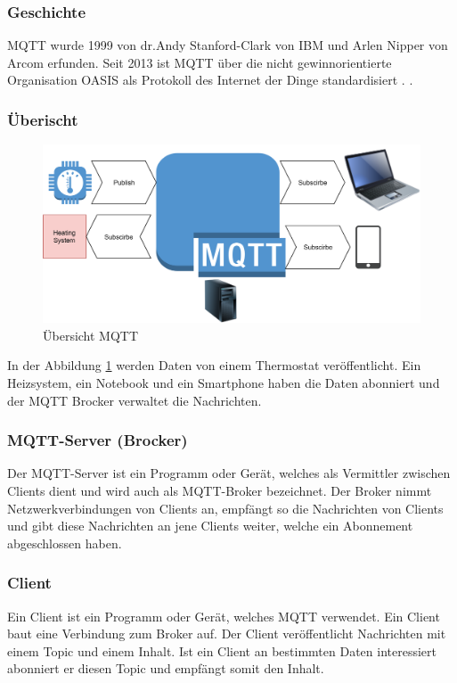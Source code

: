 \subsubsection{Geschichte}
MQTT wurde 1999 von dr.Andy Stanford-Clark von IBM und Arlen Nipper von Arcom erfunden. Seit 2013 ist MQTT über die nicht gewinnorientierte Organisation OASIS als Protokoll des Internet der Dinge standardisiert \cite{noauthor_mqtt-v5.0.pdf_nodate}. .
\subsubsection{Überischt}
 \begin{figure}[H]
 	\centering
 	\includegraphics[width=\textwidth]{graphics/OverviewMQTT.PNG}
 	\caption{Übersicht MQTT} 	
 	\label{pic: OverMQTT}
 \end{figure} 
In der Abbildung \ref{pic: OverMQTT} werden Daten von einem Thermostat veröffentlicht. Ein Heizsystem, ein Notebook und ein Smartphone haben die Daten abonniert und der MQTT Brocker verwaltet die Nachrichten. 

\subsubsection{MQTT-Server (Brocker)}
Der MQTT-Server ist ein Programm oder Gerät, welches als Vermittler zwischen Clients dient und wird auch als MQTT-Broker bezeichnet. Der Broker nimmt Netzwerkverbindungen von Clients an, empfängt so die Nachrichten von Clients und gibt diese Nachrichten an jene Clients weiter, welche ein Abonnement abgeschlossen haben.

\subsubsection{Client}
Ein Client ist ein Programm oder Gerät, welches MQTT verwendet. Ein Client baut eine Verbindung zum Broker auf. Der Client veröffentlicht Nachrichten mit einem Topic und einem Inhalt. Ist ein Client an bestimmten Daten interessiert abonniert er diesen Topic und empfängt somit den Inhalt.
 
